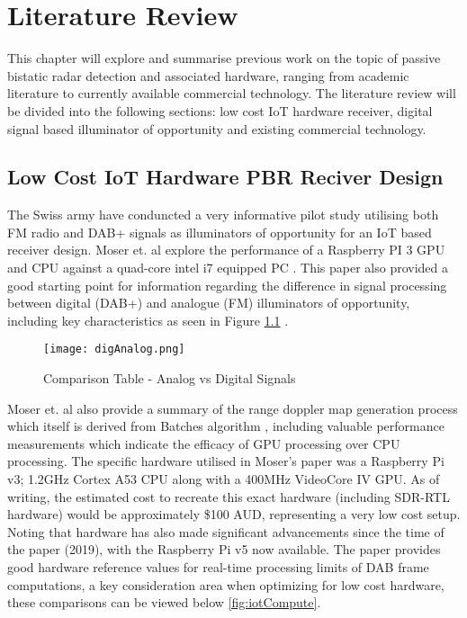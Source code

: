 \chapter{Literature Review \label{sec:litReview}}


This chapter will explore and summarise previous work on the topic of passive bistatic radar detection and associated hardware, ranging from academic literature to currently available commercial technology. The literature review will be divided into the following sections: low cost IoT hardware receiver, digital signal based illuminator of opportunity and existing commercial technology.

\section{Low Cost IoT Hardware PBR Reciver Design \label{sec:lowCostIOT}}

The Swiss army have conduncted a very informative pilot study utilising both FM radio and DAB+ signals as illuminators of opportunity for an IoT based receiver design. Moser et. al explore the performance of a Raspberry PI 3 GPU and CPU against a quad-core intel i7 equipped PC \cite{IOTpassiveRadar}. This paper also provided a good starting point for information regarding the difference in signal processing between digital (DAB+) and analogue (FM) illuminators of opportunity, including key characteristics as seen in Figure \ref{fig:signals} . 

\begin{figure}[htbp]
    \centering
    \texttt{[image: digAnalog.png]}
    \caption{Comparison Table - Analog vs Digital Signals \cite{IOTpassiveRadar}}
    \label{fig:signals}
\end{figure}

\par \vspace{0.5cm} 
\noindent Moser et. al also provide a summary of the range doppler map generation process which itself is derived from Batches algorithm \cite{DSPfm}, including valuable performance measurements which indicate the efficacy of GPU processing over CPU processing.  The specific hardware utilised in Moser's paper was a Raspberry Pi v3; 1.2GHz Cortex A53 CPU along with a 400MHz VideoCore IV GPU. As of writing, the estimated cost to recreate this exact hardware (including SDR-RTL hardware) would be approximately \$100 AUD, representing a very low cost setup. Noting that hardware has also made significant advancements since the time of the paper (2019), with the Raspberry Pi v5 now available. The paper provides good hardware reference values for real-time processing limits of DAB frame computations, a key consideration area when optimizing for low cost hardware, these comparisons can be viewed below \ref{fig:iotCompute}.

